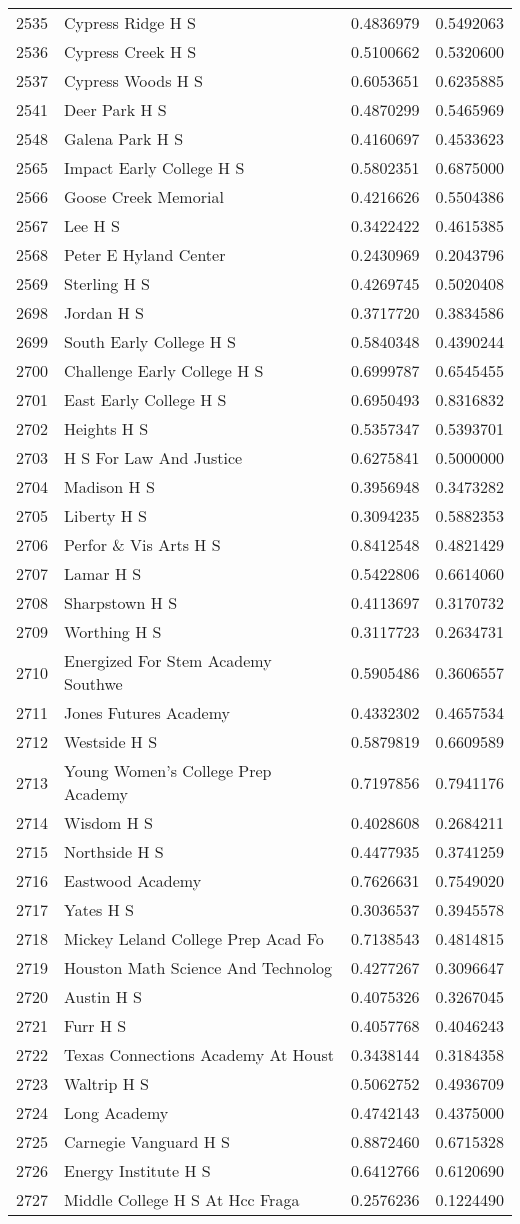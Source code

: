 \documentclass[
]{article}
\begin{document}
\begin{longtable}[]{@{}llrr@{}}
2535 & Cypress Ridge H S & 0.4836979 & 0.5492063\tabularnewline
2536 & Cypress Creek H S & 0.5100662 & 0.5320600\tabularnewline
2537 & Cypress Woods H S & 0.6053651 & 0.6235885\tabularnewline
2541 & Deer Park H S & 0.4870299 & 0.5465969\tabularnewline
2548 & Galena Park H S & 0.4160697 & 0.4533623\tabularnewline
2565 & Impact Early College H S & 0.5802351 & 0.6875000\tabularnewline
2566 & Goose Creek Memorial & 0.4216626 & 0.5504386\tabularnewline
2567 & Lee H S & 0.3422422 & 0.4615385\tabularnewline
2568 & Peter E Hyland Center & 0.2430969 & 0.2043796\tabularnewline
2569 & Sterling H S & 0.4269745 & 0.5020408\tabularnewline
2698 & Jordan H S & 0.3717720 & 0.3834586\tabularnewline
2699 & South Early College H S & 0.5840348 & 0.4390244\tabularnewline
2700 & Challenge Early College H S & 0.6999787 &
0.6545455\tabularnewline
2701 & East Early College H S & 0.6950493 & 0.8316832\tabularnewline
2702 & Heights H S & 0.5357347 & 0.5393701\tabularnewline
2703 & H S For Law And Justice & 0.6275841 & 0.5000000\tabularnewline
2704 & Madison H S & 0.3956948 & 0.3473282\tabularnewline
2705 & Liberty H S & 0.3094235 & 0.5882353\tabularnewline
2706 & Perfor \& Vis Arts H S & 0.8412548 & 0.4821429\tabularnewline
2707 & Lamar H S & 0.5422806 & 0.6614060\tabularnewline
2708 & Sharpstown H S & 0.4113697 & 0.3170732\tabularnewline
2709 & Worthing H S & 0.3117723 & 0.2634731\tabularnewline
2710 & Energized For Stem Academy Southwe & 0.5905486 &
0.3606557\tabularnewline
2711 & Jones Futures Academy & 0.4332302 & 0.4657534\tabularnewline
2712 & Westside H S & 0.5879819 & 0.6609589\tabularnewline
2713 & Young Women's College Prep Academy & 0.7197856 &
0.7941176\tabularnewline
2714 & Wisdom H S & 0.4028608 & 0.2684211\tabularnewline
2715 & Northside H S & 0.4477935 & 0.3741259\tabularnewline
2716 & Eastwood Academy & 0.7626631 & 0.7549020\tabularnewline
2717 & Yates H S & 0.3036537 & 0.3945578\tabularnewline
2718 & Mickey Leland College Prep Acad Fo & 0.7138543 &
0.4814815\tabularnewline
2719 & Houston Math Science And Technolog & 0.4277267 &
0.3096647\tabularnewline
2720 & Austin H S & 0.4075326 & 0.3267045\tabularnewline
2721 & Furr H S & 0.4057768 & 0.4046243\tabularnewline
2722 & Texas Connections Academy At Houst & 0.3438144 &
0.3184358\tabularnewline
2723 & Waltrip H S & 0.5062752 & 0.4936709\tabularnewline
2724 & Long Academy & 0.4742143 & 0.4375000\tabularnewline
2725 & Carnegie Vanguard H S & 0.8872460 & 0.6715328\tabularnewline
2726 & Energy Institute H S & 0.6412766 & 0.6120690\tabularnewline
2727 & Middle College H S At Hcc Fraga & 0.2576236 &
0.1224490\tabularnewline

\end{longtable}
\end{document}
